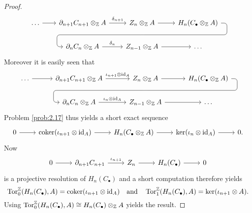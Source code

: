 \begin{proof}
\begin{equation*}
\begin{tikzcd}[column sep = 2em]
			\dots \arrow[r] & \partial_{n + 1}C_{n + 1} \otimes_\mathbb{Z} A \arrow[r,"\delta_{n + 1}"] & Z_n \otimes_\mathbb{Z} A \arrow[d,phantom, ""{coordinate, name=Z}]\arrow[r] & H_n(C_\bullet \otimes_\mathbb{Z} A) \arrow[dll,rounded corners,
				to path=
				{ -- ([xshift=2ex]\tikztostart.east)
				|- (Z) [near end]\tikztonodes
				-| ([xshift=-2ex]\tikztotarget.west)
				-- (\tikztotarget)}
			] \\
			& \partial_n C_n \otimes_\mathbb{Z} A \arrow[r, "\delta_n"] & Z_{n - 1} \otimes_\mathbb{Z} A \arrow[r] & \dots
		\end{tikzcd}
	\end{equation*}
	Moreover it is easily seen that
	\begin{equation*}
		\begin{tikzcd}[column sep = 3em]
			\dots \arrow[r] & \partial_{n + 1}C_{n + 1} \otimes_\mathbb{Z} A \arrow[r,"\iota_{n + 1} \otimes \id_A"] & Z_n \otimes_\mathbb{Z} A \arrow[d,phantom, ""{coordinate, name=Z}]\arrow[r] & H_n(C_\bullet \otimes_\mathbb{Z} A) \arrow[dll,rounded corners,
				to path=
				{ -- ([xshift=2ex]\tikztostart.east)
				|- (Z) [near end]\tikztonodes
				-| ([xshift=-2ex]\tikztotarget.west)
				-- (\tikztotarget)}
			] \\
			& \partial_n C_n \otimes_\mathbb{Z} A \arrow[r,"\iota_n \otimes \id_A"] & Z_{n - 1} \otimes_\mathbb{Z} A \arrow[r] & \dots
		\end{tikzcd}
	\end{equation*}
	Problem \ref{prob:2.17} thus yields a short exact sequence
	\begin{equation*}
		\begin{tikzcd}
			0 \arrow[r] & \coker(\iota_{n + 1} \otimes \id_A) \arrow[r] & H_n(C_\bullet \otimes_\mathbb{Z} A) \arrow[r] & \ker(\iota_n \otimes \id_A) \arrow[r] & 0. 
		\end{tikzcd}
	\end{equation*}
	Now
	\begin{equation*}
		\begin{tikzcd}
			0 \arrow[r] & \partial_{n + 1}C_{n + 1} \arrow[r,"\iota_{n + 1}"] & Z_n \arrow[r] & H_n(C_\bullet) \arrow[r] & 0 
		\end{tikzcd}
	\end{equation*}
	\noindent is a projective resolution of $H_n(C_\bullet)$ and a short computation therefore yields
	\begin{equation*}
		\operatorname{Tor}^\mathbb{Z}_0(H_n(C_\bullet),A) = \operatorname{coker}(\iota_{n + 1} \otimes \operatorname{id}_A) \quad \text{and} \quad \operatorname{Tor}^\mathbb{Z}_1(H_n(C_\bullet),A) = \ker(\iota_{n + 1} \otimes A).
	\end{equation*}
	Using $\operatorname{Tor}^\mathbb{Z}_0(H_n(C_\bullet),A) \cong H_n(C_\bullet) \otimes_\mathbb{Z} A$ yields the result.
\end{proof}
